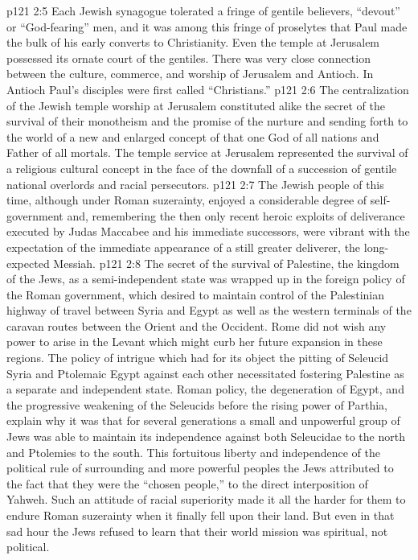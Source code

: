 \vs p121 2:5 Each Jewish synagogue tolerated a fringe of gentile believers, “devout” or “God\hyp{}fearing” men, and it was among this fringe of proselytes that Paul made the bulk of his early converts to Christianity. Even the temple at Jerusalem possessed its ornate court of the gentiles. There was very close connection between the culture, commerce, and worship of Jerusalem and Antioch. In Antioch Paul’s disciples were first called “Christians.”
\vs p121 2:6 The centralization of the Jewish temple worship at Jerusalem constituted alike the secret of the survival of their monotheism and the promise of the nurture and sending forth to the world of a new and enlarged concept of that one God of all nations and Father of all mortals. The temple service at Jerusalem represented the survival of a religious cultural concept in the face of the downfall of a succession of gentile national overlords and racial persecutors.
\pc \vs p121 2:7 The Jewish people of this time, although under Roman suzerainty, enjoyed a considerable degree of self\hyp{}government and, remembering the then only recent heroic exploits of deliverance executed by Judas Maccabee and his immediate successors, were vibrant with the expectation of the immediate appearance of a still greater deliverer, the long\hyp{}expected Messiah.
\vs p121 2:8 The secret of the survival of Palestine, the kingdom of the Jews, as a semi\hyp{}independent state was wrapped up in the foreign policy of the Roman government, which desired to maintain control of the Palestinian highway of travel between Syria and Egypt as well as the western terminals of the caravan routes between the Orient and the Occident. Rome did not wish any power to arise in the Levant which might curb her future expansion in these regions. The policy of intrigue which had for its object the pitting of Seleucid Syria and Ptolemaic Egypt against each other necessitated fostering Palestine as a separate and independent state. Roman policy, the degeneration of Egypt, and the progressive weakening of the Seleucids before the rising power of Parthia, explain why it was that for several generations a small and unpowerful group of Jews was able to maintain its independence against both Seleucidae to the north and Ptolemies to the south. This fortuitous liberty and independence of the political rule of surrounding and more powerful peoples the Jews attributed to the fact that they were the “chosen people,” to the direct interposition of Yahweh. Such an attitude of racial superiority made it all the harder for them to endure Roman suzerainty when it finally fell upon their land. But even in that sad hour the Jews refused to learn that their world mission was spiritual, not political.
